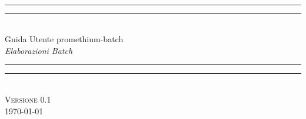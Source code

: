 \begin{titlepage}
    \newlength{\drop}%
    \textheight
    \centering
    \settowidth{\unitlength}{\Huge Guida Utente promethium-batch}
    \vspace*{\baselineskip}
    \\[\baselineskip]
    \rule{\unitlength}{1.6pt}\vspace*{-\baselineskip}\vspace*{2pt}
    \rule{\unitlength}{0.4pt}\\[\baselineskip]
    {\Huge Guida Utente promethium-batch}\\[\baselineskip]
    {\large\itshape Elaborazioni Batch}\\[0.2\baselineskip]
    \rule{\unitlength}{0.4pt}\vspace*{-\baselineskip}\vspace{3.2pt}
    \rule{\unitlength}{1.6pt}\\[\baselineskip]
    \vfill
    {\large\scshape Versione 0.1}\\[\baselineskip]
    {\small\scshape \today}\par
    \vspace*{\drop}
\end{titlepage}
